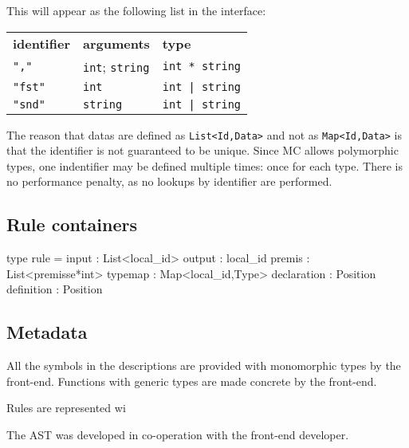 This will appear as the following list in the interface:

\begin{tabular}{lll}
    \textbf{identifier} & \textbf{arguments} & \textbf{type}\\
    \verb:",":   & \verb:int:; \verb:string: & \verb:int * string: \\
    \verb:"fst": & \verb:int:                & \verb:int | string: \\
    \verb:"snd": & \verb:string:             & \verb:int | string: \\
\end{tabular}

The reason that datas are defined as \verb|List<Id,Data>| and not as \verb|Map<Id,Data>| is that the identifier is not guaranteed to be unique.
Since MC allows polymorphic types, one indentifier may be defined multiple times: once for each type.
There is no performance penalty, as no lookups by identifier are performed.

\subsection{Rule containers}

\begin{code}
type rule = {
  input       : List<local_id>
  output      : local_id
  premis      : List<premisse*int>
  typemap     : Map<local_id,Type>
  declaration : Position
  definition  : Position
}
\end{code}

\subsection{Metadata}

All the symbols in the descriptions are provided with monomorphic types by the front-end.
Functions with generic types are made concrete by the front-end.

Rules are represented wi

The AST was developed in co-operation with the front-end developer.
